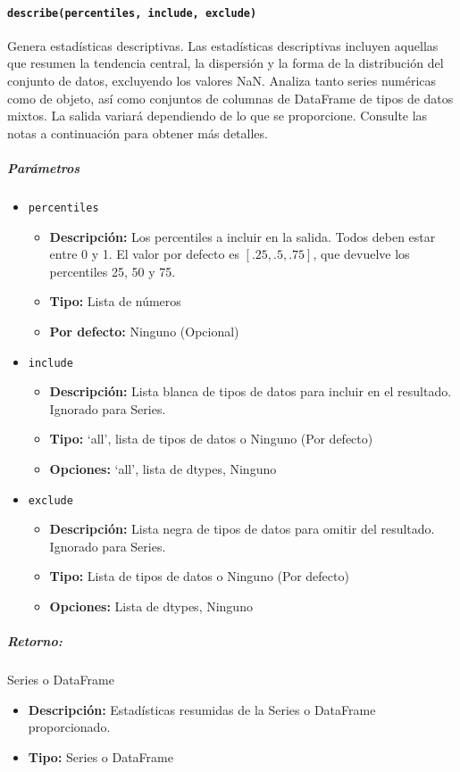 \paragraph{\texttt{describe(percentiles, include, exclude)}}Genera estadísticas descriptivas. Las estadísticas descriptivas incluyen aquellas que resumen la tendencia central, la dispersión y la forma de la distribución del conjunto de datos, excluyendo los valores NaN. Analiza tanto series numéricas como de objeto, así como conjuntos de columnas de DataFrame de tipos de datos mixtos. La salida variará dependiendo de lo que se proporcione. Consulte las notas a continuación para obtener más detalles.
\subparagraph{\textbf{Parámetros}}
\begin{itemize}
\item \texttt{percentiles}
\begin{itemize}
\item \textbf{Descripción:} Los percentiles a incluir en la salida. Todos deben estar entre 0 y 1. El valor por defecto es \([.25, .5, .75]\), que devuelve los percentiles 25, 50 y 75.
\item \textbf{Tipo:} Lista de números
\item \textbf{Por defecto:} Ninguno (Opcional)
\end{itemize}
\item \texttt{include}
\begin{itemize}
\item \textbf{Descripción:} Lista blanca de tipos de datos para incluir en el resultado. Ignorado para Series.
\item \textbf{Tipo:} ‘all’, lista de tipos de datos o Ninguno (Por defecto)
\item \textbf{Opciones:} ‘all’, lista de dtypes, Ninguno
\end{itemize}
\item \texttt{exclude}
\begin{itemize}
\item \textbf{Descripción:} Lista negra de tipos de datos para omitir del resultado. Ignorado para Series.
\item \textbf{Tipo:} Lista de tipos de datos o Ninguno (Por defecto)
\item \textbf{Opciones:} Lista de dtypes, Ninguno
\end{itemize}
\end{itemize}
\subparagraph{Retorno:} Series o DataFrame
\begin{itemize}
\item \textbf{Descripción:} Estadísticas resumidas de la Series o DataFrame proporcionado.
\item \textbf{Tipo:} Series o DataFrame
\end{itemize}
